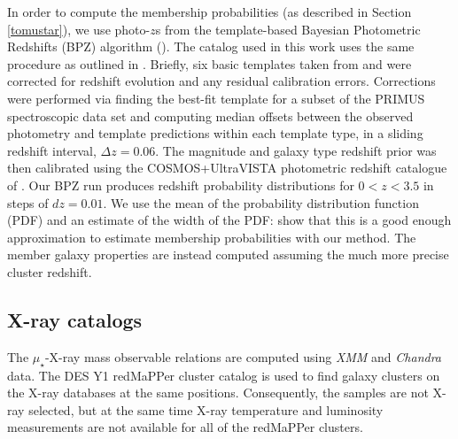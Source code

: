 In order to compute the membership probabilities (as described in Section \ref{tomustar}), we use photo-$z$s from the template-based Bayesian Photometric Redshifts (BPZ) algorithm (\citealt{bpz}). The catalog used in this work uses the same procedure as outlined in \cite{Hoyle}. Briefly, six basic templates taken from \cite{cww} and \cite{Kinney} were corrected for redshift evolution and any residual calibration errors. Corrections were performed via finding the best-fit template for a subset of the PRIMUS spectroscopic data set \citep{Cool} and computing median offsets between the observed photometry and template predictions within each template type, in a sliding redshift interval, $\Delta z = 0.06$. The magnitude and galaxy type redshift prior was then calibrated using the COSMOS+UltraVISTA photometric redshift catalogue of \citet{laigle}. Our BPZ run produces redshift probability distributions for $0<z<3.5$ in steps of $dz=0.01$. We use the mean of the probability distribution function (PDF) and an estimate of the width of the PDF: \citet{welch} show that  this is a good enough approximation to estimate membership probabilities with our method. The member galaxy properties are instead computed assuming the much more precise cluster redshift.

\subsection{X-ray catalogs}\label{sec:xray}

The $\mu_\star$-X-ray mass observable relations are computed using \emph{XMM} and \emph{Chandra} data. The DES Y1 redMaPPer cluster catalog is used to find galaxy clusters on the X-ray databases at the same positions. Consequently, the samples are not X-ray selected, but at the same time X-ray temperature and luminosity measurements are not available for all of the redMaPPer clusters.

